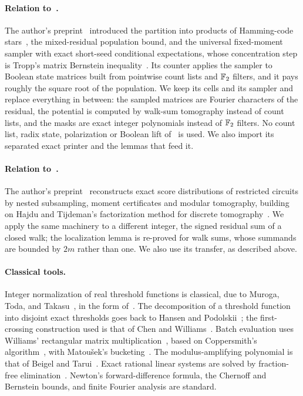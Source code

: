 \paragraph{Relation to~\cite{Nag72}.}
The author's preprint~\cite{Nag72} introduced the partition into
products of Hamming-code stars~\cite{Hamming}, the mixed-residual
population bound, and the universal fixed-moment sampler with exact
short-seed conditional expectations, whose concentration step is
Tropp's matrix Bernstein inequality~\cite[Theorem~1.6]{Tropp}. Its
counter applies the sampler to Boolean state matrices built from
pointwise count lists and \(\mathbb F_2\) filters, and it pays roughly the
square root of the population. We keep its cells and its sampler and
replace everything in between: the sampled matrices are Fourier
characters of the residual, the potential is computed by walk-sum
tomography instead of count lists, and the masks are exact integer
polynomials instead of \(\mathbb F_2\) filters. No count list, radix state,
polarization or Boolean lift of~\cite{Nag72} is used. We also import
its separated exact printer and the lemmas that feed it.

\paragraph{Relation to~\cite{NagCG}.}
The author's preprint~\cite{NagCG} reconstructs exact score
distributions of restricted circuits by nested subsampling, moment
certificates and modular tomography, building on Hajdu and
Tijdeman's factorization method for discrete tomography~\cite{HT01}.
We apply the same machinery to a different integer, the signed
residual sum of a closed walk; the localization lemma is re-proved
for walk sums, whose summands are bounded by \(2m\) rather than one.
We also use its transfer, as described above.

\paragraph{Classical tools.}
Integer normalization of real threshold functions is classical,
due to Muroga, Toda, and Takasu~\cite{MTT61}, in the form
of~\cite[Lemma~3.2]{CTW26}. The decomposition of a threshold function
into disjoint exact thresholds goes back to Hansen and
Podolskii~\cite{HP10}; the first-crossing construction used is that
of Chen and Williams~\cite[Proposition~18(2) and Appendix~B]{CW19}.
Batch evaluation uses Williams' rectangular matrix
multiplication~\cite[Corollary~4.4]{WilACC14}, based on Coppersmith's
algorithm~\cite{Cop82}, with Matou\v{s}ek's bucketing~\cite{Mat91}.
The modulus-amplifying polynomial is that of Beigel and
Tarui~\cite{BT94}. Exact rational linear systems are solved by
fraction-free elimination~\cite{Bareiss68}. Newton's forward-difference
formula, the Chernoff and Bernstein bounds, and finite Fourier
analysis are standard.



